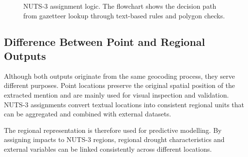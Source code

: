 \begin{figure}[htbp]
\caption{NUTS-3 assignment logic. The flowchart shows the decision path from gazetteer lookup through text-based rules and polygon checks.}
\label{fig:nuts3-flow}
\end{figure}

\newpage
\subsection{Difference Between Point and Regional Outputs}

Although both outputs originate from the same geocoding process, they serve different purposes. Point locations preserve the original spatial position of the extracted mention and are mainly used for visual inspection and validation. NUTS-3 assignments convert textual locations into consistent regional units that can be aggregated and combined with external datasets.

The regional representation is therefore used for predictive modelling. By assigning impacts to NUTS-3 regions, regional drought characteristics and external variables can be linked consistently across different locations.

